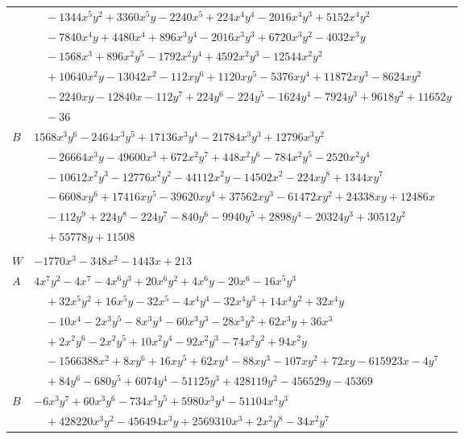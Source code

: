 \documentclass[11pt]{article}
\begin{document}
\begin{longtable}{@{}ll@{}}
 & $\quad -1344x^{5}y^{2}+3360x^{5}y-2240x^{5}+224x^{4}y^{4}-2016x^{4}y^{3}+5152x^{4}y^{2}$\\
 & $\quad -7840x^{4}y+4480x^{4}+896x^{3}y^{4}-2016x^{3}y^{3}+6720x^{3}y^{2}-4032x^{3}y$\\
 & $\quad -1568x^{3}+896x^{2}y^{5}-1792x^{2}y^{4}+4592x^{2}y^{3}-12544x^{2}y^{2}$\\
 & $\quad +10640x^{2}y-13042x^{2}-112xy^{6}+1120xy^{5}-5376xy^{4}+11872xy^{3}-8624xy^{2}$\\
 & $\quad -2240xy-12840x-112y^{7}+224y^{6}-224y^{5}-1624y^{4}-7924y^{3}+9618y^{2}+11652y$\\
 & $\quad -36$\\
$B$ & $1568x^{3}y^{6}-2464x^{3}y^{5}+17136x^{3}y^{4}-21784x^{3}y^{3}+12796x^{3}y^{2}$\\
 & $\quad -26664x^{3}y-49600x^{3}+672x^{2}y^{7}+448x^{2}y^{6}-784x^{2}y^{5}-2520x^{2}y^{4}$\\
 & $\quad -10612x^{2}y^{3}-12776x^{2}y^{2}-44112x^{2}y-14502x^{2}-224xy^{8}+1344xy^{7}$\\
 & $\quad -6608xy^{6}+17416xy^{5}-39620xy^{4}+37562xy^{3}-61472xy^{2}+24338xy+12486x$\\
 & $\quad -112y^{9}+224y^{8}-224y^{7}-840y^{6}-9940y^{5}+2898y^{4}-20324y^{3}+30512y^{2}$\\
 & $\quad +55778y+11508$\\
\addlinespace[3pt]
\multicolumn{2}{@{}l}{$g=1$, $i=5$, $m=2$, neighbours $33,2,3,4,17,18,21,27,28$}\\
$W$ & $-1770x^{3}-348x^{2}-1443x+213$\\
$A$ & $4x^{7}y^{2}-4x^{7}-4x^{6}y^{3}+20x^{6}y^{2}+4x^{6}y-20x^{6}-16x^{5}y^{3}$\\
 & $\quad +32x^{5}y^{2}+16x^{5}y-32x^{5}-4x^{4}y^{4}-32x^{4}y^{3}+14x^{4}y^{2}+32x^{4}y$\\
 & $\quad -10x^{4}-2x^{3}y^{5}-8x^{3}y^{4}-60x^{3}y^{3}-28x^{3}y^{2}+62x^{3}y+36x^{3}$\\
 & $\quad +2x^{2}y^{6}-2x^{2}y^{5}+10x^{2}y^{4}-92x^{2}y^{3}-74x^{2}y^{2}+94x^{2}y$\\
 & $\quad -1566388x^{2}+8xy^{6}+16xy^{5}+62xy^{4}-88xy^{3}-107xy^{2}+72xy-615923x-4y^{7}$\\
 & $\quad +84y^{6}-680y^{5}+6074y^{4}-51125y^{3}+428119y^{2}-456529y-45369$\\
$B$ & $-6x^{3}y^{7}+60x^{3}y^{6}-734x^{3}y^{5}+5980x^{3}y^{4}-51104x^{3}y^{3}$\\
 & $\quad +428220x^{3}y^{2}-456494x^{3}y+2569310x^{3}+2x^{2}y^{8}-34x^{2}y^{7}$\\

\end{longtable}
\end{document}
